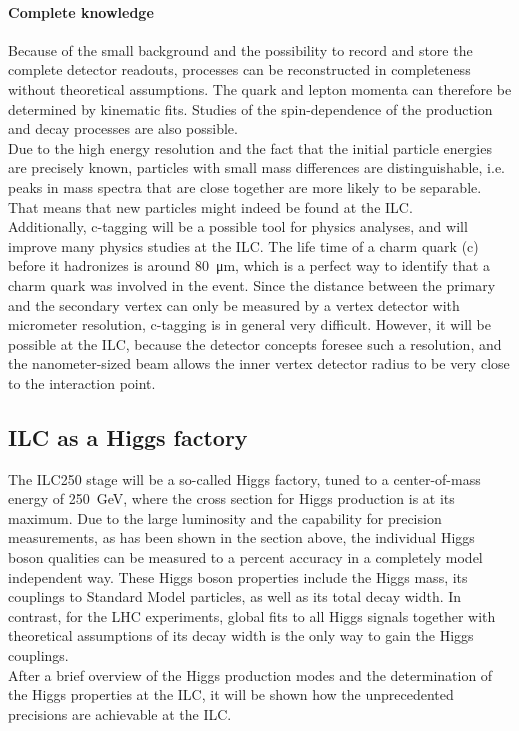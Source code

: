\paragraph{Complete knowledge}
Because of the small background and the possibility to record and store the complete detector readouts, processes can be reconstructed in completeness without theoretical assumptions.
The quark and lepton momenta can therefore be determined by kinematic fits.
Studies of the spin-dependence of the production and decay processes are also possible.\\
Due to the high energy resolution and the fact that the initial particle energies are precisely known, particles with small mass differences are distinguishable, i.e. peaks in mass spectra that are close together are more likely to be separable.
That means that new particles might indeed be found at the ILC.\\
Additionally, c-tagging will be a possible tool for physics analyses, and will improve many physics studies at the ILC.
The life time of a charm quark (c) before it hadronizes is around \SI{80}{\micro\meter}, which is a perfect way to identify that a charm quark was involved in the event.
Since the distance between the primary and the secondary vertex can only be measured by a vertex detector with micrometer resolution, c-tagging is in general very difficult.
However, it will be possible at the ILC, because the detector concepts foresee such a resolution, and the nanometer-sized beam allows the inner vertex detector radius to be very close to the interaction point.

\subsection{ILC as a Higgs factory}
The ILC250 stage will be a so-called Higgs factory, tuned to a center-of-mass energy of \SI{250}{\GeV}, where the cross section for Higgs production is at its maximum.
Due to the large luminosity and the capability for precision measurements, as has been shown in the section above, the individual Higgs boson qualities can be measured to a percent accuracy in a completely model independent way.
These Higgs boson properties include the Higgs mass, its couplings to Standard Model particles, as well as its total decay width.
In contrast, for the LHC experiments, global fits to all Higgs signals together with theoretical assumptions of its decay width is the only way to gain the Higgs couplings.
\\After a brief overview of the Higgs production modes and the determination of the Higgs properties at the ILC, it will be shown how the unprecedented precisions are achievable at the ILC.

